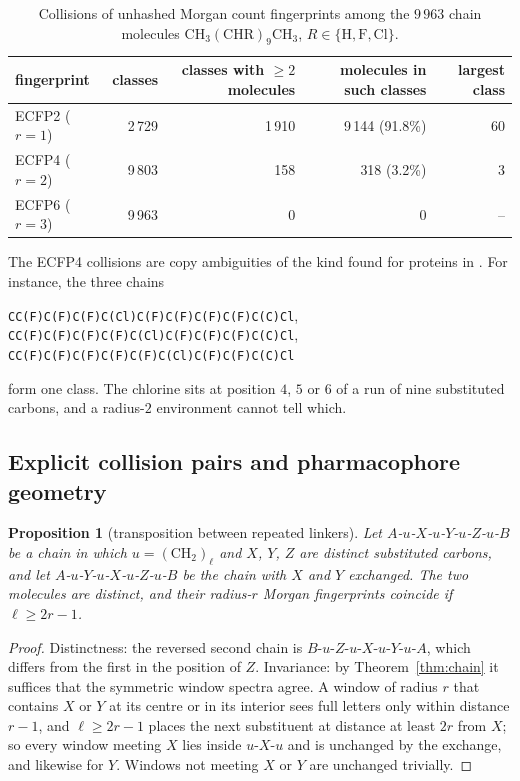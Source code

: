 \documentclass[11pt]{article}
\theoremstyle{plain}
\newtheorem{proposition}[theorem]{Proposition}
\theoremstyle{definition}
\theoremstyle{remark}
\begin{document}
\begin{table}[t]
\centering\small
\begin{tabular}{lrrrr}
\toprule
fingerprint & classes & classes with $\ge2$ molecules & molecules in such classes & largest class\\
\midrule
ECFP2 ($r=1$) & 2\,729 & 1\,910 & 9\,144 (91.8\%) & 60\\
ECFP4 ($r=2$) & 9\,803 & 158 & 318 (3.2\%) & 3\\
ECFP6 ($r=3$) & 9\,963 & 0 & 0 & --\\
\bottomrule
\end{tabular}
\caption{Collisions of unhashed Morgan count fingerprints among the $9\,963$ chain molecules
$\mathrm{CH_3(CHR)_9CH_3}$, $R\in\{\mathrm H,\mathrm F,\mathrm{Cl}\}$.}\label{tab:census}
\end{table}

The ECFP4 collisions are copy ambiguities of the kind found for proteins in \cite{CC26e}. For instance, the
three chains
\begin{center}\footnotesize
\texttt{CC(F)C(F)C(F)C(Cl)C(F)C(F)C(F)C(F)C(C)Cl},\quad
\texttt{CC(F)C(F)C(F)C(F)C(Cl)C(F)C(F)C(F)C(C)Cl},\quad
\texttt{CC(F)C(F)C(F)C(F)C(F)C(Cl)C(F)C(F)C(C)Cl}
\end{center}
form one class. The chlorine sits at position $4$, $5$ or $6$ of a run of nine substituted carbons, and a
radius-$2$ environment cannot tell which.

\subsection{Explicit collision pairs and pharmacophore geometry}

\begin{proposition}[transposition between repeated linkers]\label{prop:linker}
Let $A$-$u$-$X$-$u$-$Y$-$u$-$Z$-$u$-$B$ be a chain in which $u=(\mathrm{CH_2})_\ell$ and $X$, $Y$, $Z$ are distinct
substituted carbons, and let $A$-$u$-$Y$-$u$-$X$-$u$-$Z$-$u$-$B$ be the chain with $X$ and $Y$ exchanged. The two
molecules are distinct, and their radius-$r$ Morgan fingerprints coincide if $\ell\ge2r-1$.
\end{proposition}

\begin{proof}
Distinctness: the reversed second chain is $B$-$u$-$Z$-$u$-$X$-$u$-$Y$-$u$-$A$, which differs from the first in the
position of $Z$. Invariance: by Theorem~\ref{thm:chain} it suffices that the symmetric window spectra agree. A
window of radius $r$ that contains $X$ or $Y$ at its centre or in its interior sees full letters only within
distance $r-1$, and $\ell\ge2r-1$ places the next substituent at distance at least $2r$ from $X$; so every window
meeting $X$ lies inside $u$-$X$-$u$ and is unchanged by the exchange, and likewise for $Y$. Windows not meeting
$X$ or $Y$ are unchanged trivially.
\end{proof}
\end{document}
